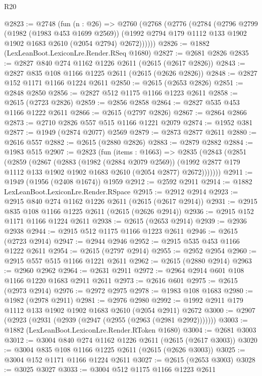 \begin{lexlean}{R20}
\begin{coremodule}
@2823 := @2748
    (fun (n : @26) =>
    @2760
      (@2768
        (@2776
          (@2784
            (@2796
              @2799
              (@1982 (@1983 @453 @1699 @2569))
              (@1992 @2794 @179 @1112 @133 @1902 @1902 @1683 @2610 (@2054 @2794) @2672))))))
@2826 := @1882 (LexLeanBoot.LexiconLre.Render.RSeq @1680)
@2827 := @2681 @2826
@2835 := @2827 @840 @274 @1162 @1226 @2611 (@2615 (@2617 @2826))
@2843 := @2827 @835 @108 @1166 @1225 @2611 (@2615 (@2626 @2826))
@2848 := @2827 @152 @1171 @1166 @1224 @2611
@2850 := @2615 (@2653 @2826)
@2851 := @2848 @2850
@2856 := @2827 @512 @1175 @1166 @1223 @2611
@2858 := @2615 (@2723 @2826)
@2859 := @2856 @2858
@2864 := @2827 @535 @453 @1166 @1222 @2611
@2866 := @2615 (@2797 @2826)
@2867 := @2864 @2866
@2873 := @2710 @2826 @557 @515 @1166 @1221 @2079
@2874 := @1952 @381
@2877 := @1949 (@2874 @2077) @2569
@2879 := @2873 @2877 @2611
@2880 := @2616 @557
@2882 := @2615 (@2880 @2826)
@2883 := @2879 @2882
@2884 := @1983 @515
@2907 := @2823
    (fun (items : @1663) =>
    @2835
      (@2843
        (@2851
          (@2859
            (@2867
              (@2883
                (@1982 (@2884 @2079 @2569))
                (@1992 @2877 @179 @1112 @133 @1902 @1902 @1683 @2610 (@2054 @2877) @2672)))))))
@2911 := @1949 (@1956 (@2408 @1674)) @1959
@2912 := @2592 @2911
@2914 := @1882 LexLeanBoot.LexiconLre.Render.RSpace
@2915 := @2912 @2914
@2923 := @2915 @840 @274 @1162 @1226 @2611 (@2615 (@2617 @2914))
@2931 := @2915 @835 @108 @1166 @1225 @2611 (@2615 (@2626 @2914))
@2936 := @2915 @152 @1171 @1166 @1224 @2611
@2938 := @2615 (@2653 @2914)
@2939 := @2936 @2938
@2944 := @2915 @512 @1175 @1166 @1223 @2611
@2946 := @2615 (@2723 @2914)
@2947 := @2944 @2946
@2952 := @2915 @535 @453 @1166 @1222 @2611
@2954 := @2615 (@2797 @2914)
@2955 := @2952 @2954
@2960 := @2915 @557 @515 @1166 @1221 @2611
@2962 := @2615 (@2880 @2914)
@2963 := @2960 @2962
@2964 := @2631 @2911
@2972 := @2964 @2914 @601 @108 @1166 @1220 @1683 @2911 @2611
@2973 := @2616 @601
@2975 := @2615 (@2973 @2914)
@2976 := @2972 @2975
@2978 := @1983 @108 @1683
@2980 := @1982 (@2978 @2911)
@2981 := @2976 @2980
@2992 := @1992 @2911 @179 @1112 @133 @1902 @1902 @1683 @2610 (@2054 @2911) @2672
@3000 := @2907 (@2923 (@2931 (@2939 (@2947 (@2955 (@2963 (@2981 @2992)))))))
@3003 := @1882 (LexLeanBoot.LexiconLre.Render.RToken @1680)
@3004 := @2681 @3003
@3012 := @3004 @840 @274 @1162 @1226 @2611 (@2615 (@2617 @3003))
@3020 := @3004 @835 @108 @1166 @1225 @2611 (@2615 (@2626 @3003))
@3025 := @3004 @152 @1171 @1166 @1224 @2611
@3027 := @2615 (@2653 @3003)
@3028 := @3025 @3027
@3033 := @3004 @512 @1175 @1166 @1223 @2611

\end{coremodule}
\end{lexlean}

